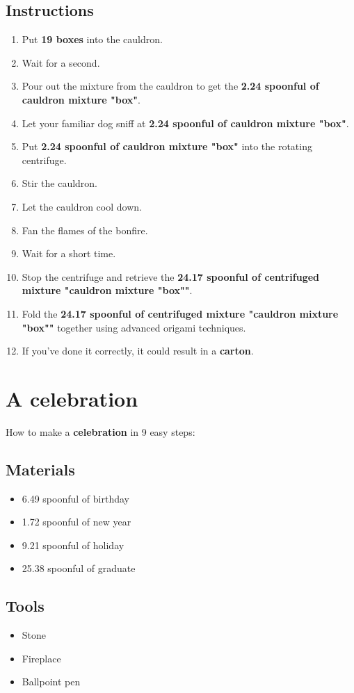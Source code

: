 \documentclass{article}
\begin{document}
\subsection{Instructions}\begin{enumerate}
\item 
Put \textbf{19 boxes} into the cauldron.
\item 
Wait for a second.
\item 
Pour out the mixture from the cauldron to get the \textbf{2.24 spoonful of cauldron mixture "box"}.
\item 
Let your familiar dog sniff at \textbf{2.24 spoonful of cauldron mixture "box"}.
\item 
Put \textbf{2.24 spoonful of cauldron mixture "box"} into the rotating centrifuge.
\item 
Stir the cauldron.
\item 
Let the cauldron cool down.
\item 
Fan the flames of the bonfire.
\item 
Wait for a short time.
\item 
Stop the centrifuge and retrieve the \textbf{24.17 spoonful of centrifuged mixture "cauldron mixture "box""}.
\item 
Fold the \textbf{24.17 spoonful of centrifuged mixture "cauldron mixture "box""} together using advanced origami techniques.
\item 
If you've done it correctly, it could result in a \textbf{carton}.
\end{enumerate}
\newpage
\section{A celebration}How to make a \textbf{celebration} in 9 easy steps:

\subsection{Materials}\begin{itemize}
\item 
6.49 spoonful of birthday
\item 
1.72 spoonful of new year
\item 
9.21 spoonful of holiday
\item 
25.38 spoonful of graduate
\end{itemize}
\subsection{Tools}\begin{itemize}
\item 
Stone
\item 
Fireplace
\item 
Ballpoint pen
\end{itemize}
\end{document}
